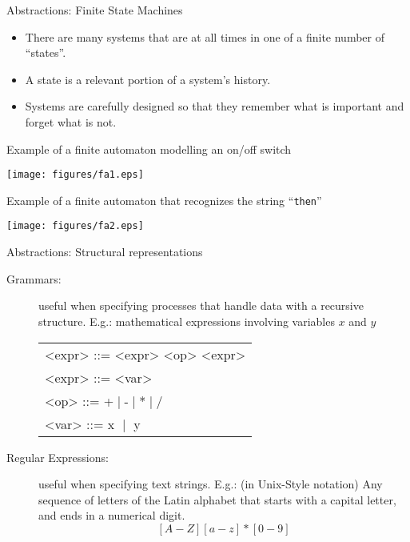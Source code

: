 \documentclass{prosper}%
\begin{document}
\begin{slide}{Abstractions: Finite State Machines}
\begin{itemize}
\item There are many systems that are at all times in one of a finite number of ``states''.
\item A state is a relevant portion of a system's history.
\item Systems are carefully designed so that they remember what is important and forget what is not.
\end{itemize}
Example of a finite automaton modelling an on/off switch
\begin{center}
\texttt{[image: figures/fa1.eps]}
\end{center}
Example of a finite automaton that recognizes the string ``{\tt then}''
\begin{center}
\texttt{[image: figures/fa2.eps]}
\end{center}
\end{slide}

\begin{slide}{ Abstractions: Structural representations}
\begin{description}
\item[Grammars:] useful when specifying processes that handle data with a recursive structure. E.g.: mathematical expressions involving variables $x$ and $y$
\begin{center}
\begin{tabular}{l}
<expr> ::= <expr> <op> <expr>  \\
<expr> ::= <var> \\
<op> ::= +$\;|\;$-$\;|\;$*$\;|\;$/\\
<var> ::= x $\;|\;$ y
\end{tabular}
\end{center}



\item[Regular Expressions:] useful when specifying text strings. E.g.: (in Unix-Style notation) Any sequence of letters of the Latin alphabet that starts with a capital letter, and ends in a numerical digit.
\[
[A-Z][a-z]*[0-9]
\]
\end{description}
\end{slide}
\end{document}
